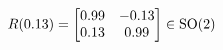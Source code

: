 \documentclass[preview]{standalone}
\begin{document}
\begin{align*}
\special{dvisvgm:raw <g id='unique000'>}R(0.13) = \begin{bmatrix} 0.99 & -0.13 \\ 0.13 & 0.99 \end{bmatrix} \in \text{SO}(2)\special{dvisvgm:raw </g>}
\end{align*}
\end{document}
